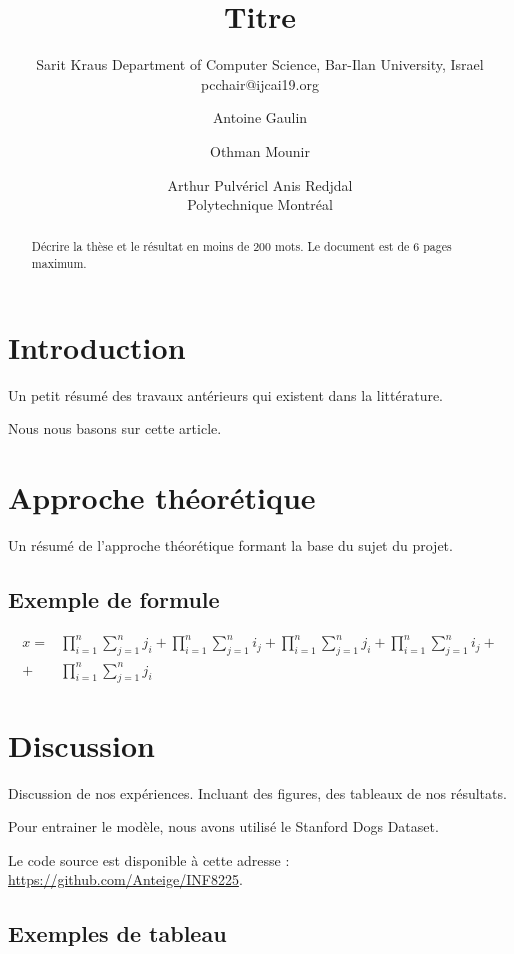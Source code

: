 \documentclass{article}
\title{Titre}
\author{
    Sarit Kraus
    \affiliations
    Department of Computer Science, Bar-Ilan University, Israel \emails
    pcchair@ijcai19.org
}
\author{
Antoine Gaulin\and
Othman Mounir\and
Arthur Pulvéricl\And
Anis Redjdal\\
\affiliations
Polytechnique Montréal\\
}
\begin{document}
\maketitle

\begin{abstract}
Décrire la thèse et le résultat en moins de 200 mots. Le document est de 6 pages maximum.
\end{abstract}

\section{Introduction}

Un petit résumé des travaux antérieurs qui existent dans la littérature.

Nous nous basons sur cette article. ~\cite{fcdh_FinalReport}

\section{Approche théorétique}

Un résumé de l'approche théorétique formant la base du sujet du projet.

\subsection{Exemple de formule}

\begin{align}
    x =& \prod_{i=1}^n \sum_{j=1}^n j_i + \prod_{i=1}^n \sum_{j=1}^n i_j + \prod_{i=1}^n \sum_{j=1}^n j_i + \prod_{i=1}^n \sum_{j=1}^n i_j + \nonumber\\
    + & \prod_{i=1}^n \sum_{j=1}^n j_i
\end{align}

\section{Discussion}

Discussion de nos expériences. Incluant des figures, des tableaux de nos résultats.

Pour entrainer le modèle, nous avons utilisé le Stanford Dogs Dataset. ~\cite{KhoslaYaoJayadevaprakashFeiFei_FGVC2011}

Le code source est disponible à cette adresse : \url{https://github.com/Anteige/INF8225}.

\subsection{Exemples de tableau}
\end{document}

